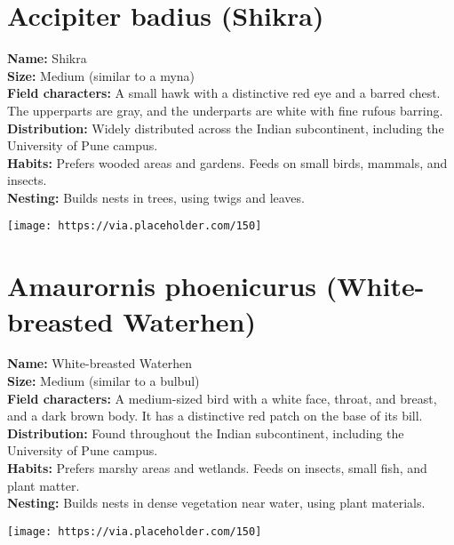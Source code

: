 \documentclass[a5paper,12pt]{memoir}
\begin{document}
\section*{Accipiter badius (Shikra)}
\textbf{Name:} Shikra \\
\textbf{Size:} Medium (similar to a myna) \\
\textbf{Field characters:} A small hawk with a distinctive red eye and a barred chest. The upperparts are gray, and the underparts are white with fine rufous barring. \\
\textbf{Distribution:} Widely distributed across the Indian subcontinent, including the University of Pune campus. \\
\textbf{Habits:} Prefers wooded areas and gardens. Feeds on small birds, mammals, and insects. \\
\textbf{Nesting:} Builds nests in trees, using twigs and leaves. \\
\begin{flushright}
\texttt{[image: https://via.placeholder.com/150]}
\end{flushright}

\newpage

\section*{Amaurornis phoenicurus (White-breasted Waterhen)}
\textbf{Name:} White-breasted Waterhen \\
\textbf{Size:} Medium (similar to a bulbul) \\
\textbf{Field characters:} A medium-sized bird with a white face, throat, and breast, and a dark brown body. It has a distinctive red patch on the base of its bill. \\
\textbf{Distribution:} Found throughout the Indian subcontinent, including the University of Pune campus. \\
\textbf{Habits:} Prefers marshy areas and wetlands. Feeds on insects, small fish, and plant matter. \\
\textbf{Nesting:} Builds nests in dense vegetation near water, using plant materials. \\
\begin{flushright}
\texttt{[image: https://via.placeholder.com/150]}
\end{flushright}

\newpage
\end{document}
